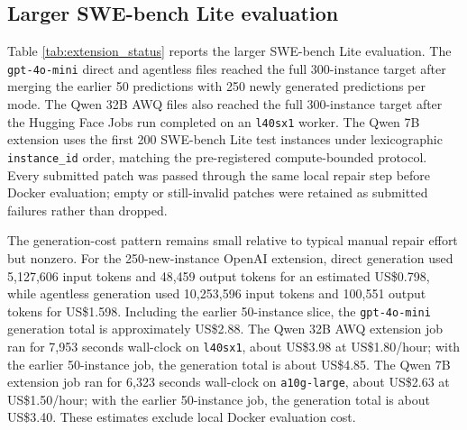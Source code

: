 \documentclass[preprint,12pt]{elsarticle}
\begin{document}
\subsection{Larger SWE-bench Lite evaluation}

Table \ref{tab:extension_status} reports the larger SWE-bench Lite evaluation. The \texttt{gpt-4o-mini} direct and agentless files reached the full 300-instance target after merging the earlier 50 predictions with 250 newly generated predictions per mode. The Qwen 32B AWQ files also reached the full 300-instance target after the Hugging Face Jobs run completed on an \texttt{l40sx1} worker. The Qwen 7B extension uses the first 200 SWE-bench Lite test instances under lexicographic \texttt{instance\_id} order, matching the pre-registered compute-bounded protocol. Every submitted patch was passed through the same local repair step before Docker evaluation; empty or still-invalid patches were retained as submitted failures rather than dropped.

The generation-cost pattern remains small relative to typical manual repair effort but nonzero. For the 250-new-instance OpenAI extension, direct generation used 5,127,606 input tokens and 48,459 output tokens for an estimated US\$0.798, while agentless generation used 10,253,596 input tokens and 100,551 output tokens for US\$1.598. Including the earlier 50-instance slice, the \texttt{gpt-4o-mini} generation total is approximately US\$2.88. The Qwen 32B AWQ extension job ran for 7,953 seconds wall-clock on \texttt{l40sx1}, about US\$3.98 at US\$1.80/hour; with the earlier 50-instance job, the generation total is about US\$4.85. The Qwen 7B extension job ran for 6,323 seconds wall-clock on \texttt{a10g-large}, about US\$2.63 at US\$1.50/hour; with the earlier 50-instance job, the generation total is about US\$3.40. These estimates exclude local Docker evaluation cost.
\end{document}
